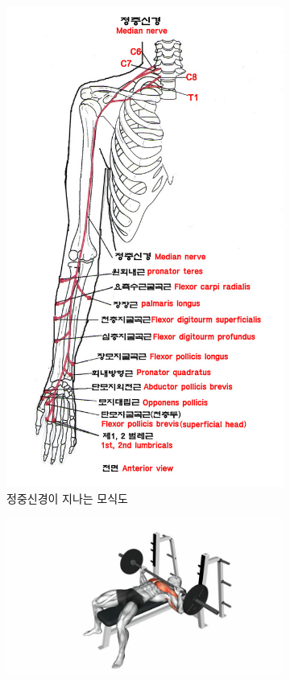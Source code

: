 \begin{figure}[h]
\begin{subfigure}[b]{0.3\textwidth}
             \includegraphics[width=\textwidth]{figures/med_nerve.jpg}
             \caption{정중신경이 지나는 모식도}
             \label{fig:1-b}
         \end{subfigure}
         \hfill
         \begin{subfigure}[b]{0.3\textwidth}
             \centering
             \includegraphics[width=\textwidth]{figures/bench.jpg}

\end{subfigure}
\end{figure}

